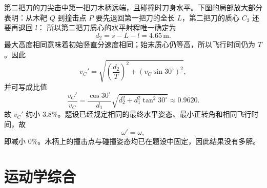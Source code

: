 {\begin{xesolution}
第二把刀的刀尖击中第一把刀木柄远端，且碰撞时刀身水平。下图的局部放大部分表明：从木靶 $Q$ 到撞击点 $P$ 要先退回第一把刀的全长 $L$，第二把刀的质心 $C_2$ 还要再退回 $l$：
\KnifeImpactDiagram
所以第二把刀质心的水平射程唯一确定为
\[
d_2=s-L-l=4.65\,\mathrm m.
\]
最大高度相同意味着初始竖直分速度相同；始末质心仍等高，所以飞行时间仍为 $T$。因此
\[
v_C'=\sqrt{\left(\frac{d_2}{T}\right)^2+\left(v_C\sin30^\circ\right)^2},
\]
并可写成比值
\[
\frac{v_C'}{v_C}=\frac{\cos30^\circ}{d_1}
\sqrt{d_2^2+d_1^2\tan^2 30^\circ}\approx0.9620.
\]
故 $v_C'$ 约小 $\boxed{3.8\%}$。题设已经规定相同的最终水平姿态、最小正转角和相同飞行时间，故
\[
\boxed{\omega'=\omega},
\]
即减小 $\boxed{0\%}$。木柄上的撞击点与碰撞姿态均已在题设中固定，因此结果没有多解。
\end{xesolution}
}

{
\graphicspath{{../../../sample/xes-original/kinematics-supplement/}{../../../sample/xes-original/kinematics-supplement/assets/}}
\section{运动学综合}
\newcommand{\KinematicKeepSpace}[1]{%
\par\begingroup
\dimen0=#1\relax
\dimen2=\lastskip
\advance\dimen0 by \dimen2
\vskip-\dimen2
\vskip0pt plus\dimen0
\penalty-100
\vskip0pt plus-\dimen0
\vskip\dimen0
\penalty9999
\vskip-\dimen0
\vskip\dimen2
\endgroup}

}

